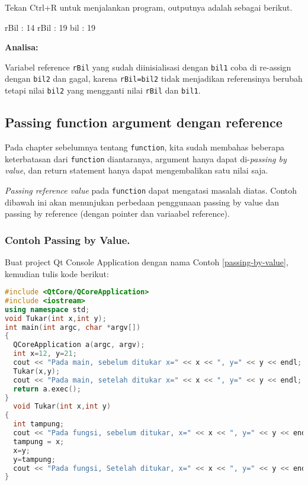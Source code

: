 Tekan Ctrl+R untuk menjalankan program, outputnya adalah sebagai
berikut.

\begin{lcverbatim}
rBil : 14
rBil : 19
bil : 19
\end{lcverbatim}

\textbf{Analisa:}

Variabel reference \texttt{rBil} yang sudah diinisialisasi dengan
\texttt{bil1} coba di re-assign dengan \texttt{bil2} dan gagal, karena
\texttt{rBil=bil2} tidak menjadikan referensinya berubah tetapi nilai
\texttt{bil2} yang mengganti nilai \texttt{rBil} dan \texttt{bil1}.

\subsection{Passing function argument dengan
reference}\label{passing-function-argument-dengan-reference}

Pada chapter sebelumnya tentang \texttt{function}, kita sudah membahas
beberapa keterbatasan dari \texttt{function} diantaranya, argument hanya
dapat di-\emph{passing by value}, dan return statement hanya dapat
mengembalikan satu nilai saja.

\emph{Passing reference value} pada \texttt{function} dapat mengatasi
masalah diatas. Contoh dibawah ini akan menunjukan perbedaan penggunaan
passing by value dan passing by reference (dengan pointer dan variaabel
reference).

\subsubsection*{Contoh  Passing by Value.}

Buat project Qt Console Application dengan nama Contoh \ref{passing-by-value}, kemudian tulis
kode berikut:

\begin{lstlisting}[language=c++, caption=Passing by Value, label=passing-by-value]
#include <QtCore/QCoreApplication>
#include <iostream>
using namespace std;
void Tukar(int x,int y);
int main(int argc, char *argv[])
{
  QCoreApplication a(argc, argv);
  int x=12, y=21;
  cout << "Pada main, sebelum ditukar x=" << x << ", y=" << y << endl;
  Tukar(x,y);
  cout << "Pada main, setelah ditukar x=" << x << ", y=" << y << endl;
  return a.exec();
}
  void Tukar(int x,int y)
{
  int tampung;
  cout << "Pada fungsi, sebelum ditukar, x=" << x << ", y=" << y << endl;
  tampung = x;
  x=y;
  y=tampung;
  cout << "Pada fungsi, Setelah ditukar, x=" << x << ", y=" << y << endl;
}
\end{lstlisting}

